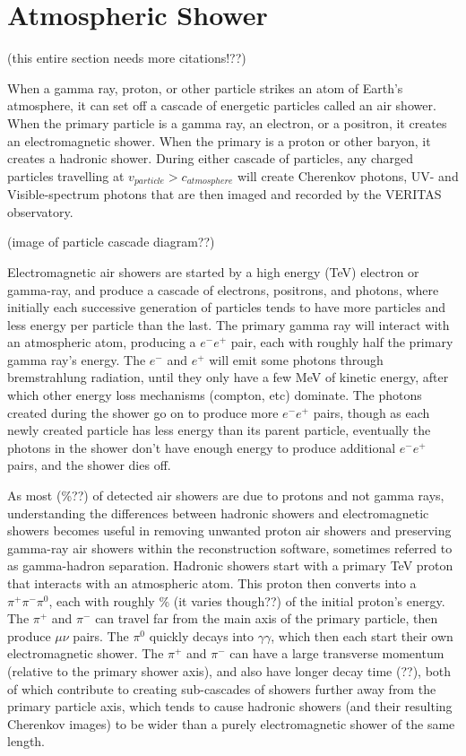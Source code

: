 \section{Atmospheric Shower}
(this entire section needs more citations!??)

When a gamma ray, proton, or other particle strikes an atom of Earth's atmosphere, it can set off a cascade of energetic particles called an air shower.
When the primary particle is a gamma ray, an electron, or a positron, it creates an electromagnetic shower.
When the primary is a proton or other baryon, it creates a hadronic shower.
During either cascade of particles, any charged particles travelling at $v_{particle} > c_{atmosphere}$ will create Cherenkov photons, UV- and Visible-spectrum photons that are then imaged and recorded by the VERITAS observatory.

(image of particle cascade diagram??)

Electromagnetic air showers are started by a high energy (\nicetilde TeV) electron or gamma-ray, and produce a cascade of electrons, positrons, and photons, where initially each successive generation of particles tends to have more particles and less energy per particle than the last.
The primary gamma ray will interact with an atmospheric atom, producing a $e^{-}e^{+}$ pair, each with roughly half the primary gamma ray's energy.
The $e^{-}$ and $e^{+}$ will emit some photons through bremstrahlung radiation, until they only have a few MeV of kinetic energy, after which other energy loss mechanisms (compton, etc) dominate.
The photons created during the shower go on to produce more $e^{-}e^{+}$ pairs, though as each newly created particle has less energy than its parent particle, eventually the photons in the shower don't have enough energy to produce additional $e^{-}e^{+}$ pairs, and the shower dies off.

As most (\%??) of detected air showers are due to protons and not gamma rays, understanding the differences between hadronic showers and electromagnetic showers becomes useful in removing unwanted proton air showers and preserving gamma-ray air showers within the reconstruction software, sometimes referred to as gamma-hadron separation.
Hadronic showers start with a primary \nicetilde TeV proton that interacts with an atmospheric atom.
This proton then converts into a $\pi^{+}\pi^{-}\pi^{0}$, each with roughly \% (it varies though??) of the initial proton's energy.
The $\pi^{+}$ and $\pi^{-}$ can travel far from the main axis of the primary particle, then produce $\mu\nu$ pairs.
The $\pi^{0}$ quickly decays into $\gamma\gamma$, which then each start their own electromagnetic shower.
The $\pi^{+}$ and $\pi^{-}$ can have a large transverse momentum (relative to the primary shower axis), and also have longer decay time (??), both of which contribute to creating sub-cascades of showers further away from the primary particle axis, which tends to cause hadronic showers (and their resulting Cherenkov images) to be wider than a purely electromagnetic shower of the same length. 

